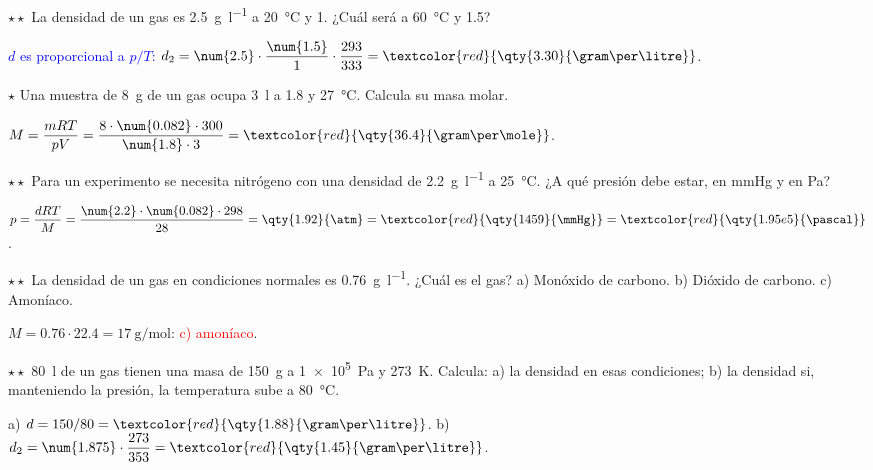 \begin{exercise}
    \(\star\star\) La densidad de un gas es \qty{2.5}{\gram\per\litre} a \qty{20}{\degreeCelsius} y \qty{1}{\atm}. ¿Cuál será a
    \qty{60}{\degreeCelsius} y \qty{1.5}{\atm}?
    \begin{solu}
        \textcolor{blue}{\(d\) es proporcional a \(p/T\):} \(d_2 = \num{2.5} \cdot \dfrac{\num{1.5}}{1} \cdot \dfrac{293}{333} = \textcolor{red}{\qty{3.30}{\gram\per\litre}}\).
    \end{solu}
\end{exercise}

\begin{exercise}
    \(\star\) Una muestra de \qty{8}{\gram} de un gas ocupa \qty{3}{\litre} a \qty{1.8}{\atm} y \qty{27}{\degreeCelsius}. Calcula su masa molar.
    \begin{solu}
        \(M = \dfrac{m R T}{p V} = \dfrac{8 \cdot \num{0.082} \cdot 300}{\num{1.8} \cdot 3} = \textcolor{red}{\qty{36.4}{\gram\per\mole}}\).
    \end{solu}
\end{exercise}

\begin{exercise}
    \(\star\star\) Para un experimento se necesita nitrógeno con una densidad de \qty{2.2}{\gram\per\litre} a \qty{25}{\degreeCelsius}. ¿A qué
    presión debe estar, en \unit{\mmHg} y en \unit{\pascal}?
    \begin{solu}
        \(p = \dfrac{d R T}{M} = \dfrac{\num{2.2} \cdot \num{0.082} \cdot 298}{28} = \qty{1.92}{\atm} = \textcolor{red}{\qty{1459}{\mmHg}} =
        \textcolor{red}{\qty{1.95e5}{\pascal}}\).
    \end{solu}
\end{exercise}

\begin{exercise}
    \(\star\star\) La densidad de un gas en condiciones normales es \qty{0.76}{\gram\per\litre}. ¿Cuál es el gas? a) Monóxido de carbono.
    b) Dióxido de carbono. c) Amoníaco.
    \begin{solu}
        \(M = \num{0.76} \cdot \num{22.4} = \qty{17}{\gram\per\mole}\): \textcolor{red}{c) amoníaco}.
    \end{solu}
\end{exercise}

\begin{exercise}
    \(\star\star\) \qty{80}{\litre} de un gas tienen una masa de \qty{150}{\gram} a \qty{1e5}{\pascal} y \qty{273}{\kelvin}. Calcula: a) la densidad en
    esas condiciones; b) la densidad si, manteniendo la presión, la temperatura sube a \qty{80}{\degreeCelsius}.
    \begin{solu}
        a) \(d = 150/80 = \textcolor{red}{\qty{1.88}{\gram\per\litre}}\). b) \(d_2 = \num{1.875} \cdot \dfrac{273}{353} = \textcolor{red}{\qty{1.45}{\gram\per\litre}}\).
    \end{solu}
\end{exercise}

